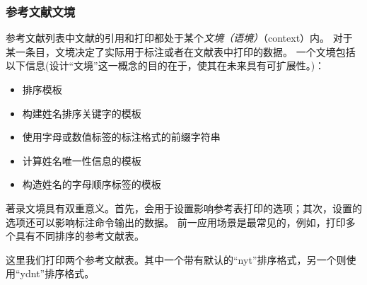 \subsubsection{参考文献文境}%
\label{use:bib:context}


参考文献列表中文献的引用和打印都处于某个\emph{文境（语境）}（context）内。
对于某一条目，文境决定了实际用于标注或者在文献表中打印的数据。
一个文境包括以下信息(设计“文境”这一概念的目的在于，使其在未来具有可扩展性。)：

\begin{itemize}
 \item %
 排序模板
 \item %
 构建姓名排序关键字的模板
 \item %
 使用字母或数值标签的标注格式的前缀字符串
 \item %
 计算姓名唯一性信息的模板
 \item %
 构造姓名的字母顺序标签的模板
\end{itemize}
%
著录文境具有双重意义。首先，会用于设置影响参考表打印的选项；其次，设置的选项还可以影响标注命令输出的数据。
前一应用场景是最常见的，例如，打印多个具有不同排序的参考文献表。

\begin{ltxexample}
\usepackage[sorting=nyt]{biblatex}

\cite{one}
\cite{two}
\printbibliography
\newrefcontext[sorting=ydnt]
\printbibliography
\end{ltxexample}
%
这里我们打印两个参考文献表。其中一个带有默认的“nyt”排序格式，另一个则使用“ydnt”排序格式。


